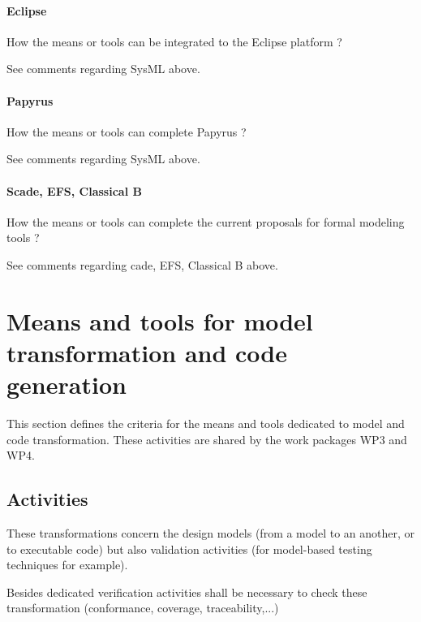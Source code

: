 \paragraph{Eclipse}
How the means or tools can be integrated to the Eclipse platform ?

\begin{author_comment}
See comments regarding SysML above.
\end{author_comment}

\paragraph{Papyrus}
How the means or tools can complete  Papyrus ?

\begin{author_comment}
See comments regarding SysML above.
\end{author_comment}


\paragraph{Scade, EFS, Classical B}
How the means or tools can complete the current proposals for formal modeling tools ?

\begin{author_comment}
See comments regarding cade, EFS, Classical B above.
\end{author_comment}


\section{Means and tools for model transformation and code generation}
\label{sec:transformation}



This section defines the criteria for the means and tools dedicated to model and code transformation. These activities are shared by the work packages WP3 and WP4.


\subsection{Activities}

These transformations concern the design models  (from a model to an another, or to  executable code) but also validation activities (for model-based testing techniques for example).

Besides dedicated verification activities shall be necessary to  check these transformation (conformance, coverage, traceability,...)

